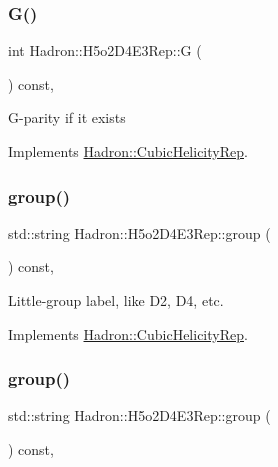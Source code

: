 \subsubsection{\texorpdfstring{G()}{G()}\hspace{0.1cm}{\footnotesize\ttfamily [3/3]}}
{\footnotesize\ttfamily int Hadron\+::\+H5o2\+D4\+E3\+Rep\+::G (\begin{DoxyParamCaption}{ }\end{DoxyParamCaption}) const\hspace{0.3cm}{\ttfamily [inline]}, {\ttfamily [virtual]}}

G-\/parity if it exists 

Implements \mbox{\hyperlink{structHadron_1_1CubicHelicityRep_a50689f42be1e6170aa8cf6ad0597018b}{Hadron\+::\+Cubic\+Helicity\+Rep}}.

\mbox{\label{structHadron_1_1H5o2D4E3Rep_a5761659c1554a5eadb627eb60ce49afa}} 
\subsubsection{\texorpdfstring{group()}{group()}\hspace{0.1cm}{\footnotesize\ttfamily [1/5]}}
{\footnotesize\ttfamily std\+::string Hadron\+::\+H5o2\+D4\+E3\+Rep\+::group (\begin{DoxyParamCaption}{ }\end{DoxyParamCaption}) const\hspace{0.3cm}{\ttfamily [inline]}, {\ttfamily [virtual]}}

Little-\/group label, like D2, D4, etc. 

Implements \mbox{\hyperlink{structHadron_1_1CubicHelicityRep_a101a7d76cd8ccdad0f272db44b766113}{Hadron\+::\+Cubic\+Helicity\+Rep}}.

\mbox{\label{structHadron_1_1H5o2D4E3Rep_a5761659c1554a5eadb627eb60ce49afa}} 
\subsubsection{\texorpdfstring{group()}{group()}\hspace{0.1cm}{\footnotesize\ttfamily [2/5]}}
{\footnotesize\ttfamily std\+::string Hadron\+::\+H5o2\+D4\+E3\+Rep\+::group (\begin{DoxyParamCaption}{ }\end{DoxyParamCaption}) const\hspace{0.3cm}{\ttfamily [inline]}, {\ttfamily [virtual]}}

